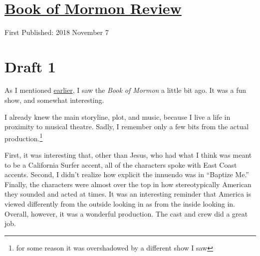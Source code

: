 \documentclass[12pt]{article}[titlepage]
\newcommand{\say}[1]{``#1''}
\newcommand{\1}{\={a}}
\newcommand{\2}{\={e}}
\newcommand{\3}{\={\i}}
\newcommand{\4}{\=o}
\newcommand{\5}{\=u}
\newcommand{\6}{\={A}}
\renewcommand{\,}{\textsuperscript{,}}
\begin{document}

\doublespacing
\section{\href{book-of-mormon.html}{Book of Mormon Review}}
First Published: 2018 November 7
\section{Draft 1}
As I mentioned \href{feeling-lucky.html}{earlier}, I saw the \textit{Book of Mormon} a little bit ago.
It was a fun show, and somewhat interesting.

I already knew the main storyline, plot, and music, because I live a life in proximity to musical theatre.
Sadly, I remember only a few bits from the actual production.\footnote{for some reason it was overshadowed by a different show I saw}

First, it was interesting that, other than Jesus, who had what I think was meant to be a California Surfer accent, all of the characters spoke with East Coast accents.
Second, I didn't realize how explicit the innuendo was in \say{Baptize Me.}
Finally, the characters were almost over the top in how stereotypically American they sounded and acted at times.
It was an interesting reminder that America is viewed differently from the outside looking in as from the inside looking in.
Overall, however, it was a wonderful production.
The cast and crew did a great job.
\end{document}
